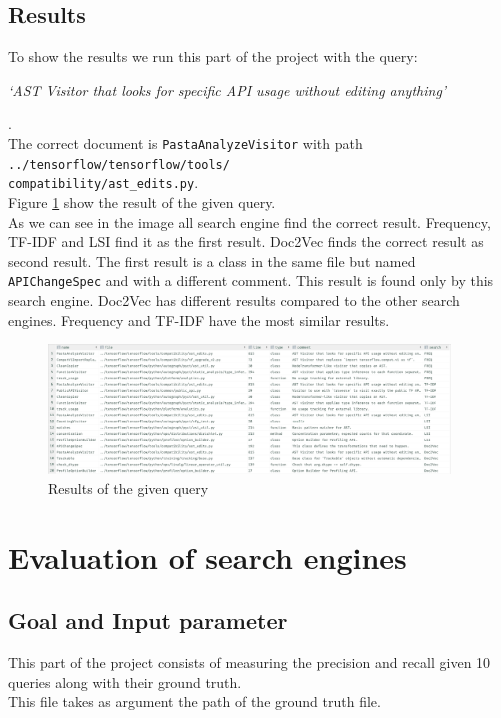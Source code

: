\documentclass [14 pt]{article}
\begin{document}
\subsection{Results} %
To show the results we run this part of the project with the query:\\
\centerline{\emph{`AST Visitor that looks for specific API usage without editing anything'}}.\\
The correct document is \texttt{PastaAnalyzeVisitor} with path \texttt{../tensorflow/tensorflow/tools/\\compatibility/ast\_edits.py}.\\
Figure \ref{fig:Part2} show the result of the given query.\\
As we can see in the image all search engine find the correct result. Frequency, TF-IDF and LSI find it as the first result. Doc2Vec finds the correct result as second result. The first result is a class in the same file but named \texttt{APIChangeSpec} and with a different comment. This result is found only by this search engine. Doc2Vec has different results compared to the other search engines. Frequency and TF-IDF have the most similar results.
\begin{figure}[h]
\centering
\includegraphics[width=0.95\textwidth]{../res/part2.png}
\caption{Results of the given query}\label{fig:Part2}
\end{figure}


\section{Evaluation of search engines} %
\subsection{Goal and Input parameter} %
This part of the project consists of measuring the precision and recall given 10 queries along with their ground truth.\\
This file takes as argument the path of the ground truth file.
\end{document}
